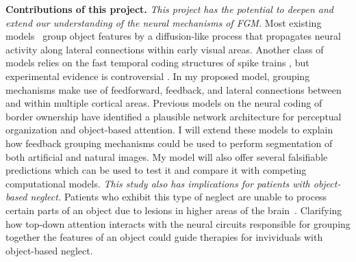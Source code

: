 \documentclass[11pt,notitlepage]{article}
\begin{document}
\textbf{Contributions of this project.}  \textit{This project has the
  potential to deepen and extend our understanding of the neural
  mechanisms of FGM.} 
 Most existing
models~\citep{Grossberg94, Grossberg97, Zhaoping05, Piech_etal13}
group object features by a diffusion-like process that propagates
neural activity along lateral connections within early visual
areas.
Another class of models
relies on the fast temporal
coding structures of spike trains \citep{Singer99b}, but experimental
evidence is controversial \citep{Thiele_Stoner03,Roelfsema_etal04,Dong_etal08a}. 
In my
proposed model,
grouping mechanisms
make use of
feedforward, feedback, and lateral connections between and within
multiple cortical areas. Previous models on the neural coding of
border ownership have identified a plausible network architecture for
perceptual organization and object-based
attention. 
I will extend these models to explain how feedback grouping mechanisms
could be used to perform segmentation of both artificial and natural images. My model will also offer several falsifiable predictions
    which can be used to test it
and compare it with 
competing computational models. \textit{This study also has
implications for patients with object-based neglect.} Patients who
exhibit this type of neglect are unable to process certain parts of an
object due to lesions in higher areas of the
brain~\citep{Marshall_Halligan93}.  Clarifying how top-down attention
interacts with the neural circuits responsible for grouping together
the features of an object could guide therapies for invividuals with
object-based neglect.
\end{document}
